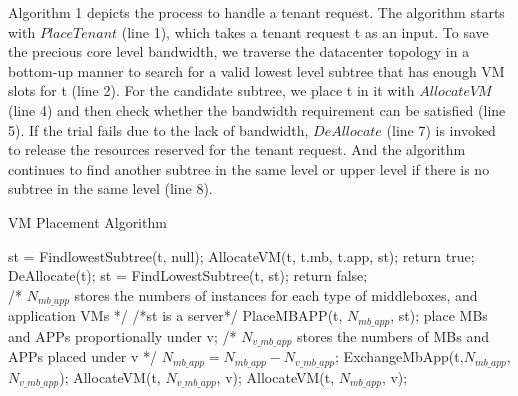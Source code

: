 \documentclass[review]{elsarticle}
\begin{document}
Algorithm 1 depicts the process to handle a tenant request. The algorithm starts with $PlaceTenant$ (line 1), which takes a tenant request t as an input. To save the precious core level bandwidth, we traverse the datacenter topology in a bottom-up manner to search for a valid lowest level subtree that has enough VM slots for t (line 2). For the candidate subtree, we place t in it with $AllocateVM$ (line 4) and then check whether the bandwidth requirement can be satisfied (line 5). If the trial fails due to the lack of bandwidth, $DeAllocate$ (line 7) is invoked to release the resources reserved for the tenant request. And the algorithm continues to find another subtree in the same level or upper level if there is no subtree in the same level (line 8). 
\begin{algorithm}[!htbp]
	\caption{VM Placement Algorithm}
	\label{alg1}
	\begin{algorithmic}[1]
		\State st = FindlowestSubtree(t, null);
		   \State AllocateVM(t, t.mb, t.app, st);
			   \State return true;
		   \EndIf 
		   \State DeAllocate(t);
		   \State st = FindLowestSubtree(t, st);
		\EndWhile
		\State return false;
	  \EndFunction
	  \\
	  /* $N_{mb\_app}$ stores the numbers of instances for 
	  \State each type of middleboxes, and application VMs */
	   /*st is a server*/
		  \State PlaceMBAPP(t, $N_{mb\_app}$, st);
	  \Else
				  \State place
				  MBs and APPs \State proportionally under v;
				 \State /* $N_{v\_mb\_app}$ stores the numbers of 
				 \State MBs and APPs placed under v */
				 \State $N_{mb\_app} = N_{mb\_app} - N_{v\_mb\_app}$;
				  \State ExchangeMbApp(t,$N_{mb\_app}$,$N_{v\_mb\_app}$);
				  \State AllocateVM(t, $N_{v\_mb\_app}$, v);
		      \Else
			      \State AllocateVM(t, $N_{mb\_app}$, v);
			  \EndIf
		\EndIf
	  \EndFor
	\EndIf
   \EndFunction %
\end{algorithmic}
\end{algorithm}
\end{document}
